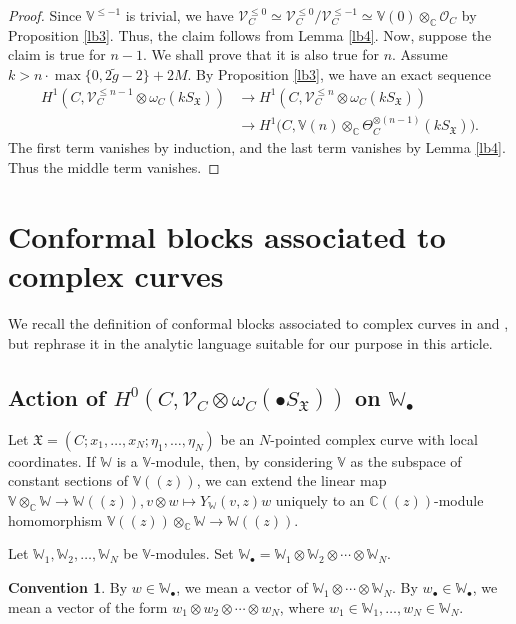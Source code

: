 \documentclass[12pt,a4paper,notitlepage]{article}
\theoremstyle{definition}
\newtheorem{cv}[df]{Convention}
\theoremstyle{plain}
\newcommand{\fk}{\mathfrak}
\newcommand{\wtd}{\widetilde}
\newcommand{\scr}{\mathscr}
\newcommand{\SX}{S_{\fk X}}
\newcommand{\blt}{\bullet}
\newcommand{\Vbb}{\mathbb V}
\newcommand{\Wbb}{\mathbb W}
\newcommand{\Cbb}{\mathbb C}
\numberwithin{equation}{section}
\begin{document}
\begin{proof}
Since $\Vbb^{\leq-1}$ is trivial, we have $\scr V_C^{\leq 0}\simeq \scr V_C^{\leq 0}/\scr V_C^{\leq -1}\simeq\Vbb(0)\otimes_\Cbb\scr O_C$ by Proposition \ref{lb3}. Thus, the claim follows from Lemma \ref{lb4}. Now, suppose the claim is true for $n-1$. We shall prove that it is also true for $n$. Assume $k>n\cdot\max\{0,2\wtd g-2\}+2M$.  By Proposition \ref{lb3}, we have an exact sequence
\begin{align*}
H^1(C,\scr V_C^{\leq n-1}\otimes\omega_C(k\SX))&\rightarrow H^1(C,\scr V_C^{\leq n}\otimes\omega_C(k\SX))\nonumber\\
&\rightarrow H^1\big(C,\Vbb(n)\otimes_{\Cbb}\Theta_C^{\otimes(n-1)}(k\SX)\big).
\end{align*}
The first term vanishes by induction, and the last term vanishes by Lemma \ref{lb4}. Thus the middle term vanishes.
\end{proof}






\section{Conformal blocks associated to complex curves}\label{lb15}


We recall the definition of conformal blocks associated to complex curves in \cite{FB04} and \cite{DGT19a,DGT19b}, but rephrase it in the analytic language suitable for our purpose in this article.


\subsection*{Action of $H^0(C,\scr V_C\otimes\omega_C(\blt S_{\fk X}))$ on $\Wbb_\blt$}


Let $\fk X=(C;x_1,\dots,x_N;\eta_1,\dots,\eta_N)$ be an $N$-pointed complex curve with local coordinates. If $\Wbb$ is a $\Vbb$-module, then, by considering $\Vbb$ as the subspace of constant sections of $\Vbb((z))$, we can extend the linear map $\Vbb\otimes_\Cbb\Wbb\rightarrow\Wbb((z)),v\otimes w\mapsto Y_\Wbb(v,z)w$ uniquely to an $\Cbb((z))$-module homomorphism  $\Vbb((z))\otimes_\Cbb\Wbb\rightarrow\Wbb((z))$. 


Let $\Wbb_1,\Wbb_2,\dots,\Wbb_N$ be $\Vbb$-modules. Set \index{Ww@$\Wbb_\blt,w_\blt$} $\Wbb_\blt=\Wbb_1\otimes \Wbb_2\otimes\cdots\otimes \Wbb_N$.  


\begin{cv}
	By $w\in\Wbb_\blt$, we mean a vector of $\Wbb_1\otimes\cdots\otimes \Wbb_N$.  By $w_\blt\in \Wbb_\blt$, we mean a vector of the form $w_1\otimes w_2\otimes\cdots\otimes w_N$, where $w_1\in \Wbb_1,\dots,w_N\in\Wbb_N$.
\end{cv}
\end{document}
